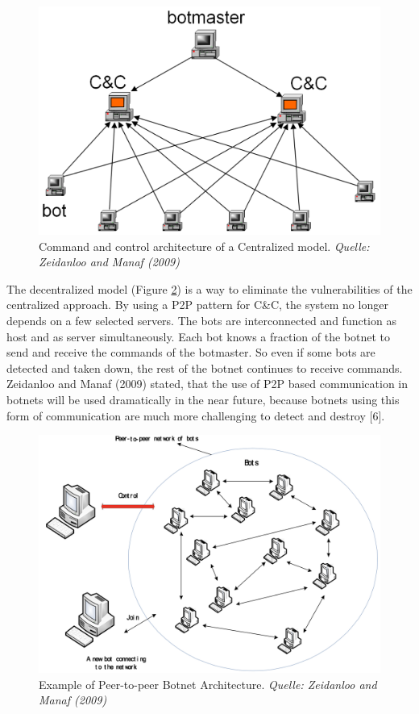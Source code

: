 \begin{figure}[ht]
\begin{center} \includegraphics[scale=0.3]{Talk11/CC-centralized} \end{center}
\caption{Command and control architecture of a Centralized model. \textit{Quelle: Zeidanloo and Manaf (2009)}}
\label{fig:centralized}
\end{figure}

The decentralized model (Figure \ref{fig:decentralized}) is a way to eliminate the vulnerabilities of the centralized approach. By using a P2P pattern for C\&C, the system no longer depends on a few selected servers. The bots are interconnected and function as host and as server simultaneously. Each bot knows a fraction of the botnet to send and receive the commands of the botmaster. So even if some bots are detected and taken down, the rest of the botnet continues to receive commands. Zeidanloo and Manaf (2009) stated, that the use of P2P based communication in botnets will be used dramatically in the near future, because botnets using this form of communication are much more challenging to detect and destroy [6].

\begin{figure}[ht]
\begin{center} \includegraphics[scale=0.3]{Talk11/CC-P2P} \end{center}
\caption{Example of Peer-to-peer Botnet Architecture. \textit{Quelle: Zeidanloo and Manaf (2009)}}
\label{fig:decentralized}
\end{figure}

